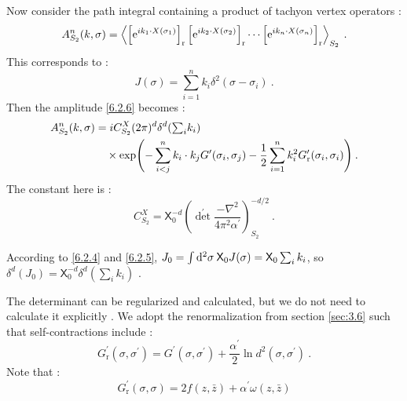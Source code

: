 Now consider the path integral containing a product of tachyon vertex operators :
\begin{equation}
	A_{S_{2}}^{n}(k, \sigma)=\left\langle\left[\mathrm{e}^{i k_{1} \cdot X(\sigma_{1})}\right]_{\mathrm{r}}
	\left[\mathrm{e}^{i k_{2} \cdot X(\sigma_{2})}\right]_{\mathrm{r}} \cdots
	\left[\mathrm{e}^{i k_{n} \cdot X(\sigma_{n})}\right]_{\mathrm{r}}\right\rangle_{S_{2}} \:. \label{6.2.11}
\end{equation}
This corresponds to :
\begin{equation}
	J(\sigma)=\sum_{i=1}^{n} k_{i} \delta^{2}(\sigma-\sigma_{i}) \:. \label{6.2.12}
\end{equation}
Then the amplitude \eqref{6.2.6} becomes :
\begin{align}
	A_{S_{2}}^{n}(k, \sigma) &=i C_{S_{2}}^{X}(2 \pi)^{d} \delta^{d}({\textstyle \sum_{i}} k_{i}) \nonumber \\
	& \quad \times \exp \Biggl(-\sum_{ i<j}^{n} k_{i} \cdot k_{j} G^{\prime}(\sigma_{i}, \sigma_{j})
	-\frac{1}{2} \sum_{i=1}^{n} k_{i}^{2} G_{\mathrm{r}}^{\prime}(\sigma_{i}, \sigma_{i})\Biggr) \:. \label{6.2.13}
\end{align}
The constant here is :
\begin{equation}
	C_{S_{2}}^{X}=\mathsf{X}_{0}^{-d}\left(\operatorname{det}^{\prime} \frac{-\nabla^{2}}{4 \pi^{2} \alpha^{\prime}}\right)_{S_{2}}^{-d/2} 
	\:. \label{6.2.14}
\end{equation}
\begin{tcolorbox}
	\begin{remark}
		According to \eqref{6.2.4} and \eqref{6.2.5}, $J_{0}=\int \mathrm{d}^{2} \sigma \: \mathsf{X}_{0} J(\sigma)= \mathsf{X}_{0} \sum_{i} k_{i}$, so $\delta^{d}(J_{0})=\mathsf{X}_{0}^{-d} \delta^{d}(\sum_{i} k_{i})$ .
	\end{remark}
\end{tcolorbox}
\noindent The determinant can be regularized and calculated, but we do not need to calculate it explicitly . We adopt the renormalization from section \ref{sec:3.6} such that self-contractions include :
\begin{equation}
	G_{\mathrm{r}}^{\prime}(\sigma, \sigma^{\prime})=G^{\prime}(\sigma, \sigma^{\prime})
	+\frac{\alpha^{\prime}}{2} \ln d^{2}(\sigma, \sigma^{\prime}) \:. \label{6.2.15}
\end{equation}
Note that :
\begin{equation}
	G_{\mathrm{r}}^{\prime}(\sigma, \sigma)=2 f(z, \bar{z})+\alpha^{\prime} \omega(z, \bar{z}) \label{6.2.16}
\end{equation}
